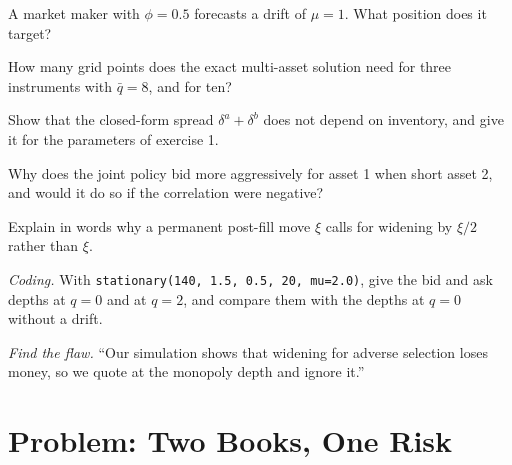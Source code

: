 \begin{exercise}[$\star$]\label{exo:hf:extensions-of-the-inventory-framework:2}
A market maker with $\phi=0.5$ forecasts a drift of $\mu=1$. What position does it target?
\end{exercise}

\begin{exercise}[$\star$]\label{exo:hf:extensions-of-the-inventory-framework:3}
How many grid points does the exact multi-asset solution need for three instruments with $\bar q=8$, and for ten?
\end{exercise}

\begin{exercise}[$\star\star$]\label{exo:hf:extensions-of-the-inventory-framework:4}
Show that the closed-form spread $\delta^a+\delta^b$ does not depend on inventory, and give it for the parameters of exercise 1.
\end{exercise}

\begin{exercise}[$\star\star$]\label{exo:hf:extensions-of-the-inventory-framework:5}
Why does the joint policy bid more aggressively for asset 1 when short asset 2, and would it do so if the correlation were negative?
\end{exercise}

\begin{exercise}[$\star\star$]\label{exo:hf:extensions-of-the-inventory-framework:6}
Explain in words why a permanent post-fill move $\xi$ calls for widening by $\xi/2$ rather than $\xi$.
\end{exercise}

\begin{exercise}[$\star\star\star$]\label{exo:hf:extensions-of-the-inventory-framework:7}
\emph{Coding.} With \texttt{stationary(140, 1.5, 0.5, 20, mu=2.0)}, give the bid and ask depths at $q=0$ and at $q=2$, and compare them with the
depths at $q=0$ without a drift.
\end{exercise}

\begin{exercise}[$\star\star\star$]\label{exo:hf:extensions-of-the-inventory-framework:8}
\emph{Find the flaw.} ``Our simulation shows that widening for adverse selection loses money, so we quote at the monopoly depth and ignore it.''
\end{exercise}

\section{Problem: Two Books, One Risk}


